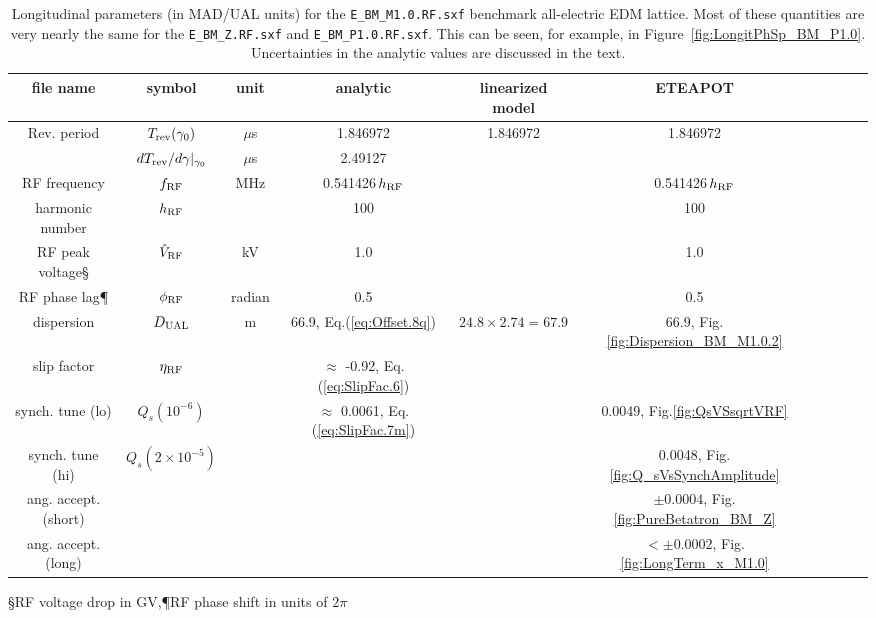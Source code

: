 \documentclass[]{article}
\begin{document}
%
%
\begin{table}[h]
\caption{\label{tbl:benchmarkParamsLongit}Longitudinal parameters (in MAD/UAL units) 
for the {\tt E\_BM\_M1.0.RF.sxf} benchmark all-electric EDM lattice.  
Most of these quantities are very nearly the same for the 
{\tt E\_BM\_Z.RF.sxf} and {\tt E\_BM\_P1.0.RF.sxf}.
This can be seen, for example, in Figure~\ref{fig:LongitPhSp_BM_P1.0}.
Uncertainties in the analytic values are discussed in the text. 
} 
\medskip
\centering
\begin{tabular}{|c|c|c|c|c|c|c|c|c|c|}           \hline
file name         & symbol                & unit     &         analytic                   & linearized model      & ETEAPOT \\ \hline
Rev. period       & $T_{\rm rev}(\gamma_0)$ & $\mu$s   &        1.846972                    & 1.846972              & 1.846972  \\      
                  & $dT_{\rm rev}/d\gamma|_{\gamma_0}$ & $\mu$s    &       2.49127                     &                       &            \\
RF frequency      & $f_{\rm RF}$            & MHz      &        0.541426\,$h_{\rm RF}$       &              & 0.541426\,$h_{\rm RF}$ \\  
harmonic number   &  $h_{\rm RF}$           &          &      100                           &                       &     100      \\
RF peak voltage\S &  $\hat V_{\rm RF}$      & kV       &      1.0                           &                       &     1.0    \\
RF phase lag\P    &  $\phi_{\rm RF}$        & radian   &      0.5                            &                       &    0.5    \\ \hline\hline
dispersion        &  $D_{\rm UAL}$          &   m      & 66.9, Eq.(\ref{eq:Offset.8q})      & $24.8\times2.74=67.9$ &  66.9, Fig.\ref{fig:Dispersion_BM_M1.0.2}  \\
slip factor       & $\eta_{\rm RF}$         &         & $\approx$ -0.92, Eq.(\ref{eq:SlipFac.6})    &                       &              \\
synch. tune (lo)  & $Q_s(10^{-6})$         &         & $\approx$ 0.0061, Eq.(\ref{eq:SlipFac.7m})  &                       & 0.0049, Fig.\ref{fig:QsVSsqrtVRF} \\
synch. tune (hi)  & $Q_s(2\times10^{-5})$  &          &                                    &                      & 0.0048, Fig.\ref{fig:Q_sVsSynchAmplitude}  \\ \hline
ang. accept. (short) &                    &          &                                    &                      & $\pm0.0004$, Fig.\ref{fig:PureBetatron_BM_Z}  \\
ang. accept. (long)  &                    &          &                                    &                      & $<\pm0.0002$, Fig.\ref{fig:LongTerm_x_M1.0}  \\
\hline
\end{tabular}
\medskip
\qquad \S RF voltage drop in GV,\quad\P RF phase shift in units of $2\pi$
\end{table}
%
\end{document}
